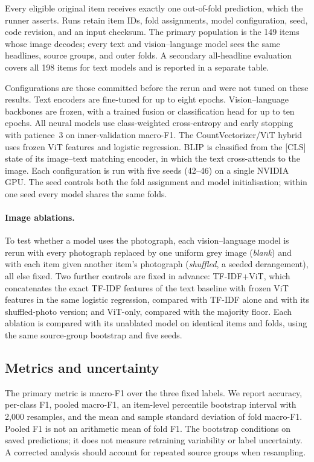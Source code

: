 \documentclass[11pt]{article}
\begin{document}
Every eligible original item receives exactly one out-of-fold prediction, which the runner asserts. Runs retain item IDs, fold assignments, model configuration, seed, code revision, and an input checksum. The primary population is the 149 items whose image decodes; every text and vision--language model sees the same headlines, source groups, and outer folds. A secondary all-headline evaluation covers all 198 items for text models and is reported in a separate table.

Configurations are those committed before the rerun and were not tuned on these results. Text encoders are fine-tuned for up to eight epochs. Vision--language backbones are frozen, with a trained fusion or classification head for up to ten epochs. All neural models use class-weighted cross-entropy and early stopping with patience~3 on inner-validation macro-F1. The CountVectorizer/ViT hybrid uses frozen ViT features \citep{dosovitskiy2021vit} and logistic regression. BLIP is classified from the [CLS] state of its image--text matching encoder, in which the text cross-attends to the image. Each configuration is run with five seeds (42--46) on a single NVIDIA GPU. The seed controls both the fold assignment and model initialisation; within one seed every model shares the same folds.

\paragraph{Image ablations.} To test whether a model uses the photograph, each vision--language model is rerun with every photograph replaced by one uniform grey image (\emph{blank}) and with each item given another item's photograph (\emph{shuffled}, a seeded derangement), all else fixed. Two further controls are fixed in advance: TF-IDF+ViT, which concatenates the exact TF-IDF features of the text baseline with frozen ViT features in the same logistic regression, compared with TF-IDF alone and with its shuffled-photo version; and ViT-only, compared with the majority floor. Each ablation is compared with its unablated model on identical items and folds, using the same source-group bootstrap and five seeds.

\subsection{Metrics and uncertainty}
The primary metric is macro-F1 over the three fixed labels. We report accuracy, per-class F1, pooled macro-F1, an item-level percentile bootstrap interval with 2,000 resamples, and the mean and sample standard deviation of fold macro-F1. Pooled F1 is not an arithmetic mean of fold F1. The bootstrap conditions on saved predictions; it does not measure retraining variability or label uncertainty. A corrected analysis should account for repeated source groups when resampling.
\end{document}
